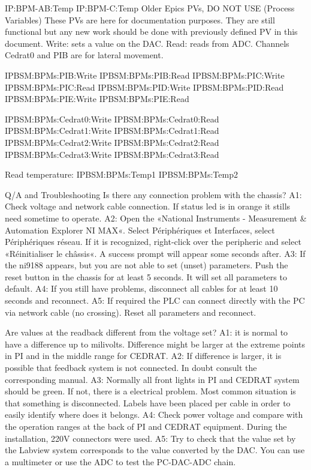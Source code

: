 \documentclass[a4paper,11pt]{book}
\begin{document}
IP:BPM-AB:Temp
IP:BPM-C:Temp
Older Epics PVs, DO NOT USE (Process Variables)
These PVs are here for documentation purposes. They are still functional but any new work should be done with previously defined PV in this document.
Write: sets a value on the DAC.
Read: reads from ADC.
Channels Cedrat0 and PIB are for lateral movement.

IPBSM:BPMs:PIB:Write
IPBSM:BPMs:PIB:Read
IPBSM:BPMs:PIC:Write
IPBSM:BPMs:PIC:Read
IPBSM:BPMs:PID:Write
IPBSM:BPMs:PID:Read
IPBSM:BPMs:PIE:Write
IPBSM:BPMs:PIE:Read


IPBSM:BPMs:Cedrat0:Write
IPBSM:BPMs:Cedrat0:Read
IPBSM:BPMs:Cedrat1:Write
IPBSM:BPMs:Cedrat1:Read
IPBSM:BPMs:Cedrat2:Write
IPBSM:BPMs:Cedrat2:Read
IPBSM:BPMs:Cedrat3:Write
IPBSM:BPMs:Cedrat3:Read

Read temperature:
IPBSM:BPMs:Temp1
IPBSM:BPMs:Temp2

Q/A and Troubleshooting
Is there any connection problem with the chassis?
A1: Check voltage and network cable connection. If status led is in orange it stills need sometime to operate.
A2: Open the «National Instruments - Measurement \& Automation Explorer NI MAX«. Select Périphériques et Interfaces, select Périphériques réseau. If it is recognized, right-click over the peripheric and select «Réinitialiser le châssis«. A success prompt will appear some seconds after.
A3: If the ni9188 appears, but you are not able to set (unset) parameters. Push the reset button in the chassis for at least 5 seconds. It will set all parameters to default.
A4: If you still have problems, disconnect all cables for at least 10 seconds and reconnect.
A5: If required the PLC can connect directly with the PC via network cable (no crossing). Reset all parameters and reconnect.

Are values at the readback different from the voltage set?
A1: it is normal to have a difference up to milivolts. Difference might be larger at the extreme points in PI and in the middle range for CEDRAT.
A2: If difference is larger, it is possible that feedback system is not connected. In doubt  consult the corresponding manual.
A3: Normally all front lights in PI and CEDRAT system should be green. If not, there is a electrical problem. Most common situation is that something is disconnected. Labels have been placed per cable in order to easily identify where does it belongs.
A4: Check power voltage and compare with the operation ranges at the back of PI and CEDRAT equipment. During the installation, 220V connectors were used.
A5: Try to check that the value set by the Labview system corresponds to the value converted by the DAC. You can use a multimeter or use the ADC to test the PC-DAC-ADC chain.
\end{document}
